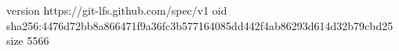 version https://git-lfs.github.com/spec/v1
oid sha256:4476d72bb8a866471f9a36fc3b577164085dd442f4ab86293d614d32b79cbd25
size 5566
